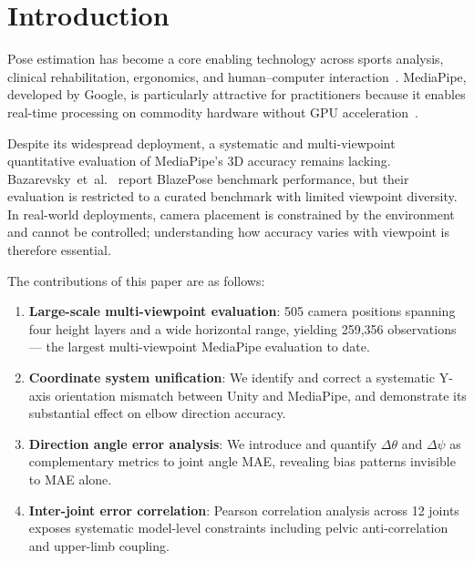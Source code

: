 \documentclass[twocolumn]{article}
\begin{document}
\vspace{-0.8em}

\section{Introduction}

Pose estimation has become a core enabling technology across sports
analysis, clinical rehabilitation, ergonomics, and human–computer
interaction~\cite{mediapipe,blazepose}. MediaPipe, developed by Google, is
particularly attractive for practitioners because it enables real-time
processing on commodity hardware without GPU acceleration~\cite{mediapipe}.

Despite its widespread deployment, a systematic and multi-viewpoint
quantitative evaluation of MediaPipe's 3D accuracy remains lacking.
Bazarevsky~et~al.~\cite{blazepose} report BlazePose benchmark performance,
but their evaluation is restricted to a curated benchmark with limited
viewpoint diversity. In real-world deployments, camera placement is
constrained by the environment and cannot be controlled; understanding how
accuracy varies with viewpoint is therefore essential.


The contributions of this paper are as follows:
\begin{enumerate}\itemsep0pt
  \item \textbf{Large-scale multi-viewpoint evaluation}: 505 camera
        positions spanning four height layers and a wide horizontal range,
        yielding 259,356 observations — the largest multi-viewpoint
        MediaPipe evaluation to date.
  \item \textbf{Coordinate system unification}: We identify and correct a
        systematic Y-axis orientation mismatch between Unity and MediaPipe,
        and demonstrate its substantial effect on elbow direction accuracy.
  \item \textbf{Direction angle error analysis}: We introduce and quantify
        $\Delta\theta$ and $\Delta\psi$ as complementary metrics to joint
        angle MAE, revealing bias patterns invisible to MAE alone.
  \item \textbf{Inter-joint error correlation}: Pearson correlation analysis
        across 12 joints exposes systematic model-level constraints including
        pelvic anti-correlation and upper-limb coupling.
\end{enumerate}
\end{document}
